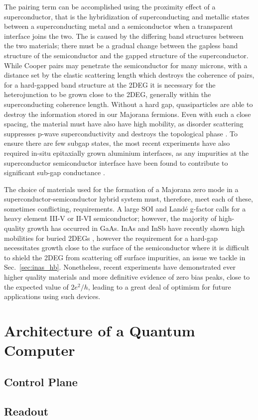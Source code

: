 The pairing term can be accomplished using the proximity effect of a superconductor, that is the hybridization of superconducting and metallic states
between a superconducting metal and a semiconductor when a transparent interface joins the two. The is caused by the differing band structures between
the two materials; there must be a gradual change between the gapless band structure of the semiconductor and the gapped structure of the superconductor.
While Cooper pairs may penetrate the semiconductor for many microns, with a distance set by the elastic scattering length which destroys the coherence
of pairs, for a hard-gapped band structure at the 2DEG it is necessary for the heterojunction to be grown close to the 2DEG, generally within the
superconducting coherence length. Without a hard gap, quasiparticles are able to destroy the information stored in our Majorana fermions. Even with such a close spacing,
the material must have also have high mobility, as disorder scattering suppresses p-wave superconductivity and destroys the topological phase \cite{PhysRevB.84.144526}.
To ensure there are few subgap states, the most recent experiments have also required in-situ epitaxially grown aluminium interfaces, as any impurities at the superconductor
semiconductor interface have been found to contribute to significant sub-gap conductance \cite{nnano.2014.306}.

The choice of materials used for the formation of a Majorana zero mode in a superconductor-semiconductor hybrid system must, therefore, meet each of these, sometimes
conflicting, requirements. A large SOI and Land\'e g-factor calls for a heavy element III-V or II-VI semiconductor; however, the majority of high-quality growth has occurred
in GaAs. InAs and InSb have recently shown high mobilities for buried 2DEGs \cite{PhysRevMaterials.2.104602,doi:10.1063/1.4993784}, however the requirement for a hard-gap necessitates growth close to the surface of the semiconductor where it is difficult to shield the 2DEG from scattering off surface impurities, an issue we
tackle in Sec.~\ref{sec:inas_hb}. Nonetheless, recent experiments have demonstrated ever higher quality materials and more definitive evidence of zero bias peaks, close
to the expected value of $2e^2/h$\cite{PhysRevLett.119.136803,nature26142}, leading to a great deal of optimism for future applications using such devices.

\section{Architecture of a Quantum Computer}
\label{sec:arch}
  \subsection{Control Plane}
  \subsection{Readout}
  \label{sec:readout}